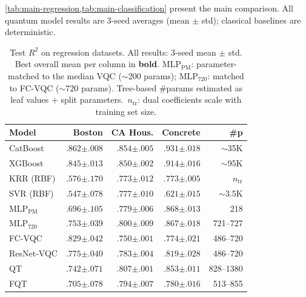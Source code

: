 \documentclass[10pt,conference]{IEEEtran}
\begin{document}
\cref{tab:main-regression,tab:main-classification} present the main comparison.
All quantum model results are 3-seed averages (mean $\pm$ std); classical baselines are deterministic.

\begin{table}[t]
\centering
\caption{Test $R^2$ on regression datasets. All results: 3-seed mean $\pm$ std. Best overall mean per column in \textbf{bold}. MLP$_{\text{PM}}$: parameter-matched to the median VQC (${\sim}$200 params); MLP$_{720}$: matched to FC-VQC (${\sim}$720 params). Tree-based \#params estimated as leaf values + split parameters.\protect\footnotemark\ $n_{\text{tr}}$: dual coefficients scale with training set size.}
\label{tab:main-regression}
\small
\begin{tabular}{lrrrr}
\toprule
Model & Boston & CA Hous. & Concrete & \#p \\
\midrule
CatBoost & $\mathbf{.862}{\scriptstyle\pm.008}$ & $\mathbf{.854}{\scriptstyle\pm.005}$ & $\mathbf{.931}{\scriptstyle\pm.018}$ & ${\sim}$35K \\
XGBoost & $.845{\scriptstyle\pm.013}$ & $.850{\scriptstyle\pm.002}$ & $.914{\scriptstyle\pm.016}$ & ${\sim}$95K \\
KRR (RBF) & $.576{\scriptstyle\pm.170}$ & $.773{\scriptstyle\pm.012}$ & $.773{\scriptstyle\pm.005}$ & $n_{\text{tr}}$ \\
SVR (RBF) & $.547{\scriptstyle\pm.078}$ & $.777{\scriptstyle\pm.010}$ & $.621{\scriptstyle\pm.015}$ & ${\sim}$3.5K \\
\midrule
MLP$_{\text{PM}}$ & $.696{\scriptstyle\pm.105}$ & $.779{\scriptstyle\pm.006}$ & $.868{\scriptstyle\pm.013}$ & 218 \\
MLP$_{720}$ & $.753{\scriptstyle\pm.039}$ & $.800{\scriptstyle\pm.009}$ & $.867{\scriptstyle\pm.018}$ & 721--727 \\
\midrule
FC-VQC & $.829{\scriptstyle\pm.042}$ & $.750{\scriptstyle\pm.001}$ & $.774{\scriptstyle\pm.021}$ & 486--720 \\
ResNet-VQC & $.775{\scriptstyle\pm.040}$ & $.783{\scriptstyle\pm.004}$ & $.819{\scriptstyle\pm.028}$ & 486--720 \\
QT & $.742{\scriptstyle\pm.071}$ & $.807{\scriptstyle\pm.001}$ & $.853{\scriptstyle\pm.011}$ & 828--1380 \\
FQT & $.705{\scriptstyle\pm.078}$ & $.794{\scriptstyle\pm.007}$ & $.780{\scriptstyle\pm.016}$ & 513--855 \\
\bottomrule
\end{tabular}
\vspace{-5pt}
\end{table}
\end{document}
